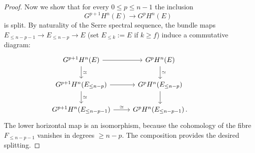 \documentclass[10pt,a4paper]{amsart}
\begin{document}
\begin{proof}
Now we show that for every $0\leq p\leq n-1$ the inclusion
\[
G^{p+1}H^n(E)\to G^{p}H^n(E)
\]
is split. By naturality of the Serre spectral sequence, the bundle maps $E_{\leq n-p-1}\to E_{\leq n-p}\to E$ (set $E_{\leq k}:=E$ if $k\geq f$) induce a commutative diagram:
 \[\begin{tikzcd}
    G^{p+1}H^n(E)\arrow[d,"\simeq"]\arrow[r]&G^{p}H^n(E)\arrow[d,"\simeq"]\\
     G^{p+1}H^n(E_{\leq n-p})\arrow[r]\arrow[d,"\simeq"]& G^{p}H^n(E_{\leq n-p})\arrow[d]\\
     G^{p+1}H^n(E_{\leq n-p-1})\arrow[r,"\simeq"]& G^{p}H^n(E_{\leq n-p-1})\, .&
 \end{tikzcd}\]
The lower horizontal map is an isomorphism, because the cohomology of the fibre $F_{\leq n-p-1}$ vanishes in degrees $\geq n-p$. The composition provides the desired splitting.
\end{proof}
\end{document}
